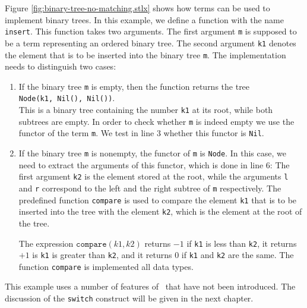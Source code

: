 Figure \ref{fig:binary-tree-no-matching.stlx} shows how terms can be used to implement
binary trees.  In this example, we define a function with the name \texttt{insert}.  This function
takes two arguments.  The first argument \texttt{m} is supposed to be a term representing an ordered binary
tree.  The second argument \texttt{k1} denotes the element that is to be inserted into the binary
tree \texttt{m}.   The implementation needs to distinguish two cases:
\begin{enumerate}
\item If the binary tree \texttt{m} is empty, then the function returns the tree
      \\[0.2cm]
      \hspace*{1.3cm}
      \texttt{Node(k1, Nil(), Nil())}.
      \\[0.2cm]
      This is a binary tree containing the number \texttt{k1} at its root, while both subtrees are
      empty.  In order to check whether \texttt{m} is indeed empty we use the functor of the term \texttt{m}.  We test in line
      3 whether this functor is \texttt{Nil}.
\item If the binary tree \texttt{m} is nonempty, the functor of \texttt{m} is
      \texttt{Node}.  In this case, we need to extract the arguments of this
      functor, which is done in line 6: The first argument \texttt{k2} is the element stored at the
      root, while the arguments \texttt{l} and \texttt{r} correspond to the left and the right
      subtree of \texttt{m} respectively.  The predefined function \texttt{compare} is used to
      compare the element \texttt{k1} that is to be inserted into the tree with the element
      \texttt{k2}, which is the element at the root of the tree.

      The expression $\texttt{compare}(k1, k2)$ returns $-1$ if \texttt{k1} is less than
      \texttt{k2}, it returns $+1$ is \texttt{k1} is greater than \texttt{k2}, and it returns $0$
      if \texttt{k1} and \texttt{k2} are the same.  The function \texttt{compare} is implemented
      all data types. 
\end{enumerate}
This example uses a number of features of \setlx\ that have not been introduced. The discussion of
the \texttt{switch} construct will be given in the next chapter.

